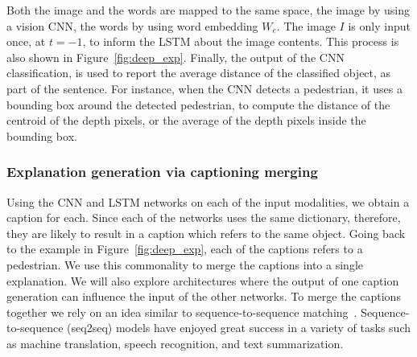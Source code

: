 Both the image and the words are mapped to the same space, the image by using a vision CNN, the words by using word embedding $W_e$.
The image $I$ is only input once, at $t = -1$, to inform the LSTM about the image contents. This process is also shown in Figure~\ref{fig:deep_exp}.
Finally, the output of the CNN classification, is used to report the average distance of the classified object, as part of the sentence. For instance, when the CNN detects a pedestrian, it uses a bounding box around the detected pedestrian, to compute the distance of the centroid of the depth pixels, or the average of the depth pixels inside the bounding box. 

\subsubsection{Explanation generation via captioning merging}
\label{subsec:explain}

Using the CNN and LSTM networks on each of the input modalities, we obtain a caption for each.
Since each of the networks uses the same dictionary, therefore, they are likely to result in a caption which refers to the same object. 
Going back to the example in Figure~\ref{fig:deep_exp}, each of the captions refers to a pedestrian. 
We use this commonality to merge the captions into a single explanation. 
We will also explore architectures where the output of one caption generation can influence the input of the other networks. 
To merge the captions together we rely on an idea similar to sequence-to-sequence matching~\cite{sutskever2014sequence}.
Sequence-to-sequence (seq2seq) models have enjoyed great success in a variety of tasks such as machine translation, speech recognition, and text summarization.


